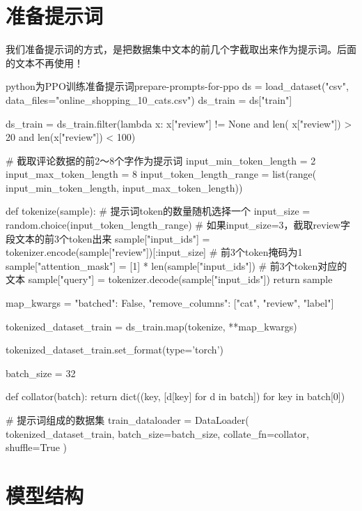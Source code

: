 \documentclass[lang=cn,newtx,10pt,scheme=chinese]{elegantbook}
\begin{document}
\section{准备提示词}

\begin{marker}
我们准备提示词的方式，是把数据集中文本的前几个字截取出来作为提示词。后面的文本不再使用！
\end{marker}

\begin{codebox}{python}{为PPO训练准备提示词}{prepare-prompts-for-ppo}
ds = load_dataset("csv", data_files="online_shopping_10_cats.csv")
ds_train = ds["train"]

ds_train = ds_train.filter(lambda x: x["review"] != None and len(
    x["review"]) > 20 and len(x["review"]) < 100)

# 截取评论数据的前2～8个字作为提示词
input_min_token_length = 2
input_max_token_length = 8
input_token_length_range = list(range(
    input_min_token_length,
    input_max_token_length))

def tokenize(sample):
    # 提示词token的数量随机选择一个
    input_size = random.choice(input_token_length_range)
    # 如果input_size=3，截取review字段文本的前3个token出来
    sample["input_ids"] = tokenizer.encode(sample["review"])[:input_size]
    # 前3个token掩码为1
    sample["attention_mask"] = [1] * len(sample["input_ids"])
    # 前3个token对应的文本
    sample["query"] = tokenizer.decode(sample["input_ids"])
    return sample


map_kwargs = {
    "batched": False,
    "remove_columns": ["cat", "review", "label"]
}

tokenized_dataset_train = ds_train.map(tokenize, **map_kwargs)

tokenized_dataset_train.set_format(type='torch')

batch_size = 32

def collator(batch):
    return dict((key, [d[key] for d in batch]) for key in batch[0])

# 提示词组成的数据集
train_dataloader = DataLoader(
    tokenized_dataset_train,
    batch_size=batch_size,
    collate_fn=collator,
    shuffle=True
)
\end{codebox}

\section{模型结构}
\end{document}
